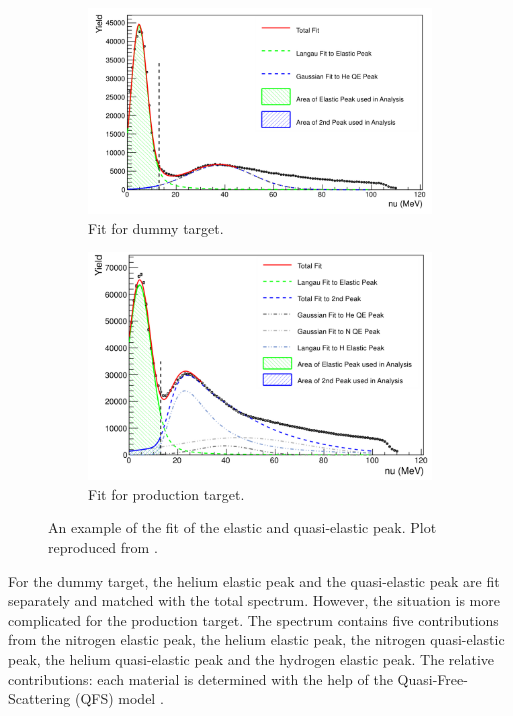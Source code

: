 \begin{figure}[tb!]
  \centering
  \begin{subfigure}[t]{0.52\textwidth}
    \includegraphics[width=\textwidth]{figs/packing-fraction-dummy.png}
    \caption{Fit for dummy target.}
  \end{subfigure}
  \begin{subfigure}[t]{0.46\textwidth}
    \includegraphics[width=\textwidth]{figs/packing-fraction-production.png}
    \caption{Fit for production target.}
  \end{subfigure}
  \caption[An example of the fit of the elastic and quasi-elastic peak.]{An example of the fit of the elastic and quasi-elastic peak. Plot reproduced from \cite{Cummings2015}. \label{C7S2F6}}
\end{figure}

For the dummy target, the helium elastic peak and the quasi-elastic peak are fit separately and matched with the total spectrum. However, the situation is more complicated for the production target. The spectrum contains five contributions from the nitrogen elastic peak, the helium elastic peak, the nitrogen quasi-elastic peak, the helium quasi-elastic peak and the hydrogen elastic peak. The relative contributions: each material is determined with the help of the Quasi-Free-Scattering (QFS) model \cite{Lightbody1988}.

